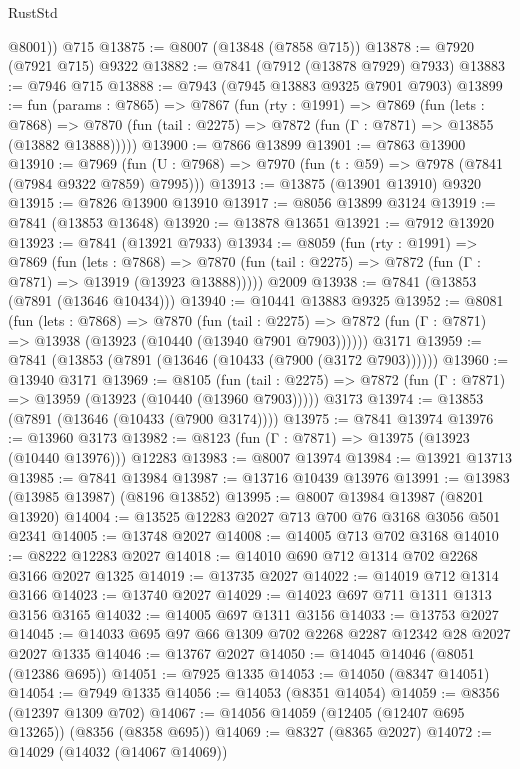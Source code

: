 \begin{lexlean}{RustStd}
\begin{coremodule}
{\begin{coremodule}
{{{{{{{{{{{{{{{{{{{{{{{{{{{{{{{{{{{{{{{{{{{{{{{{{{{{{{        @8001))
    @715
@13875 := @8007 (@13848 (@7858 @715))
@13878 := @7920 (@7921 @715) @9322
@13882 := @7841 (@7912 (@13878 @7929) @7933)
@13883 := @7946 @715
@13888 := @7943 (@7945 @13883 @9325 @7901 @7903)
@13899 := fun (params : @7865) =>
  @7867
    (fun (rty : @1991) =>
    @7869
      (fun (lets : @7868) =>
      @7870 (fun (tail : @2275) => @7872 (fun (Γ : @7871) => @13855 (@13882 @13888)))))
@13900 := @7866 @13899
@13901 := @7863 @13900
@13910 := @7969
    (fun (U : @7968) => @7970 (fun (t : @59) => @7978 (@7841 (@7984 @9322 @7859) @7995)))
@13913 := @13875 (@13901 @13910) @9320
@13915 := @7826 @13900 @13910
@13917 := @8056 @13899 @3124
@13919 := @7841 (@13853 @13648)
@13920 := @13878 @13651
@13921 := @7912 @13920
@13923 := @7841 (@13921 @7933)
@13934 := @8059
    (fun (rty : @1991) =>
    @7869
      (fun (lets : @7868) =>
      @7870 (fun (tail : @2275) => @7872 (fun (Γ : @7871) => @13919 (@13923 @13888)))))
    @2009
@13938 := @7841 (@13853 (@7891 (@13646 @10434)))
@13940 := @10441 @13883 @9325
@13952 := @8081
    (fun (lets : @7868) =>
    @7870
      (fun (tail : @2275) =>
      @7872 (fun (Γ : @7871) => @13938 (@13923 (@10440 (@13940 @7901 @7903))))))
    @3171
@13959 := @7841 (@13853 (@7891 (@13646 (@10433 (@7900 (@3172 @7903))))))
@13960 := @13940 @3171
@13969 := @8105
    (fun (tail : @2275) => @7872 (fun (Γ : @7871) => @13959 (@13923 (@10440 (@13960 @7903)))))
    @3173
@13974 := @13853 (@7891 (@13646 (@10433 (@7900 @3174))))
@13975 := @7841 @13974
@13976 := @13960 @3173
@13982 := @8123 (fun (Γ : @7871) => @13975 (@13923 (@10440 @13976))) @12283
@13983 := @8007 @13974
@13984 := @13921 @13713
@13985 := @7841 @13984
@13987 := @13716 @10439 @13976
@13991 := @13983 (@13985 @13987) (@8196 @13852)
@13995 := @8007 @13984 @13987 (@8201 @13920)
@14004 := @13525 @12283 @2027 @713 @700 @76 @3168 @3056 @501 @2341
@14005 := @13748 @2027
@14008 := @14005 @713 @702 @3168
@14010 := @8222 @12283 @2027
@14018 := @14010 @690 @712 @1314 @702 @2268 @3166 @2027 @1325
@14019 := @13735 @2027
@14022 := @14019 @712 @1314 @3166
@14023 := @13740 @2027
@14029 := @14023 @697 @711 @1311 @1313 @3156 @3165
@14032 := @14005 @697 @1311 @3156
@14033 := @13753 @2027
@14045 := @14033 @695 @97 @66 @1309 @702 @2268 @2287 @12342 @28 @2027 @2027 @1335
@14046 := @13767 @2027
@14050 := @14045 @14046 (@8051 (@12386 @695))
@14051 := @7925 @1335
@14053 := @14050 (@8347 @14051)
@14054 := @7949 @1335
@14056 := @14053 (@8351 @14054)
@14059 := @8356 (@12397 @1309 @702)
@14067 := @14056 @14059 (@12405 (@12407 @695 @13265)) (@8356 (@8358 @695))
@14069 := @8327 (@8365 @2027)
@14072 := @14029 (@14032 (@14067 @14069))
}}}}}}}}}}}}}}}}}}}}}}}}}}}}}}}}}}}}}}}}}}}}}}}}}}}}}}
\end{coremodule}}
\end{coremodule}
\end{lexlean}
